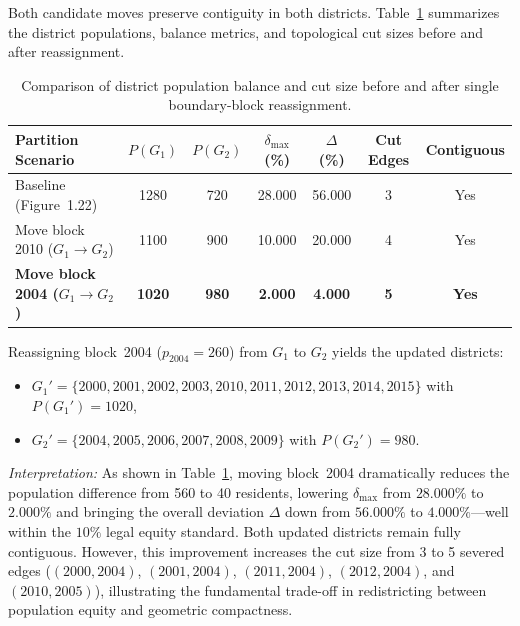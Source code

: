 \documentclass[11pt, a4paper]{article}
\begin{document}
Both candidate moves preserve contiguity in both districts. Table~\ref{tab:c2_comparison} summarizes the district populations, balance metrics, and topological cut sizes before and after reassignment.

\begin{table}[htbp]
\centering
\caption{Comparison of district population balance and cut size before and after single boundary-block reassignment.}
\label{tab:c2_comparison}
\begin{tabular}{@{}lcccccc@{}}
\toprule
Partition Scenario & $P(G_1)$ & $P(G_2)$ & $\delta_{\max}$ (\%) & $\Delta$ (\%) & Cut Edges & Contiguous \\
\midrule
Baseline (Figure~1.22) & 1280 & 720 & 28.000 & 56.000 & 3 & Yes \\
Move block 2010 ($G_1 \to G_2$) & 1100 & 900 & 10.000 & 20.000 & 4 & Yes \\
\textbf{Move block 2004 ($G_1 \to G_2$)} & \textbf{1020} & \textbf{980} & \textbf{2.000} & \textbf{4.000} & \textbf{5} & \textbf{Yes} \\
\bottomrule
\end{tabular}
\end{table}

Reassigning block~2004 ($p_{2004} = 260$) from $G_1$ to $G_2$ yields the updated districts:
\begin{itemize}
\item $G_1' = \{2000, 2001, 2002, 2003, 2010, 2011, 2012, 2013, 2014, 2015\}$ with $P(G_1') = 1020$,
\item $G_2' = \{2004, 2005, 2006, 2007, 2008, 2009\}$ with $P(G_2') = 980$.
\end{itemize}

\textit{Interpretation:} As shown in Table~\ref{tab:c2_comparison}, moving block~2004 dramatically reduces the population difference from 560 to 40 residents, lowering $\delta_{\max}$ from $28.000\%$ to $2.000\%$ and bringing the overall deviation $\Delta$ down from $56.000\%$ to $4.000\%$---well within the $10\%$ legal equity standard. Both updated districts remain fully contiguous. However, this improvement increases the cut size from 3 to 5 severed edges ($(2000, 2004)$, $(2001, 2004)$, $(2011, 2004)$, $(2012, 2004)$, and $(2010, 2005)$), illustrating the fundamental trade-off in redistricting between population equity and geometric compactness.
\end{document}
